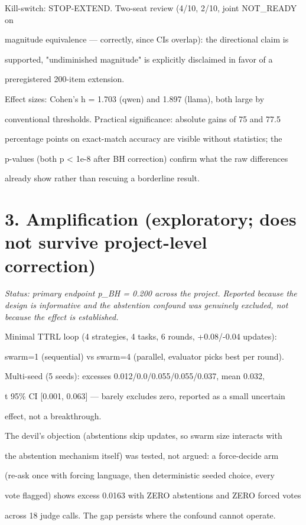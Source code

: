 \documentclass[11pt]{article}
\begin{document}
Kill-switch: STOP-EXTEND. Two-seat review (4/10, 2/10, joint NOT\_READY on

magnitude equivalence --- correctly, since CIs overlap): the directional claim is

supported, "undiminished magnitude" is explicitly disclaimed in favor of a

preregistered 200-item extension.


Effect sizes: Cohen's h = 1.703 (qwen) and 1.897 (llama), both large by

conventional thresholds. Practical significance: absolute gains of 75 and 77.5

percentage points on exact-match accuracy are visible without statistics; the

p-values (both p < 1e-8 after BH correction) confirm what the raw differences

already show rather than rescuing a borderline result.


\section*{3. Amplification (exploratory; does not survive project-level correction)}

{\it Status: primary endpoint p\_BH = 0.200 across the project. Reported because the design is informative and the abstention confound was genuinely excluded, not because the effect is established.}


Minimal TTRL loop (4 strategies, 4 tasks, 6 rounds, +0.08/-0.04 updates):

swarm=1 (sequential) vs swarm=4 (parallel, evaluator picks best per round).

Multi-seed (5 seeds): excesses 0.012/0.0/0.055/0.055/0.037, mean 0.032,

t 95\% CI [0.001, 0.063] --- barely excludes zero, reported as a small uncertain

effect, not a breakthrough.


The devil's objection (abstentions skip updates, so swarm size interacts with

the abstention mechanism itself) was tested, not argued: a force-decide arm

(re-ask once with forcing language, then deterministic seeded choice, every

vote flagged) shows excess 0.0163 with ZERO abstentions and ZERO forced votes

across 18 judge calls. The gap persists where the confound cannot operate.
\end{document}
